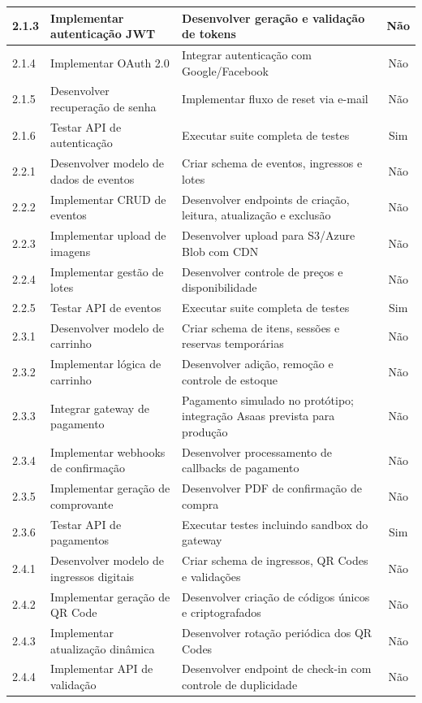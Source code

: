 \begin{table}[H]
\begin{tabular}{|p{0.9cm}|p{6.2cm}|p{5.7cm}|c|}
2.1.3 & Implementar autenticação JWT & Desenvolver geração e validação de tokens & Não \\ \hline
2.1.4 & Implementar OAuth 2.0 & Integrar autenticação com Google/Facebook & Não \\ \hline
2.1.5 & Desenvolver recuperação de senha & Implementar fluxo de reset via e-mail & Não \\ \hline
2.1.6 & Testar API de autenticação & Executar suite completa de testes & Sim \\ \hline
2.2.1 & Desenvolver modelo de dados de eventos & Criar schema de eventos, ingressos e lotes & Não \\ \hline
2.2.2 & Implementar CRUD de eventos & Desenvolver endpoints de criação, leitura, atualização e exclusão & Não \\ \hline
2.2.3 & Implementar upload de imagens & Desenvolver upload para S3/Azure Blob com CDN & Não \\ \hline
2.2.4 & Implementar gestão de lotes & Desenvolver controle de preços e disponibilidade & Não \\ \hline
2.2.5 & Testar API de eventos & Executar suite completa de testes & Sim \\ \hline
2.3.1 & Desenvolver modelo de carrinho & Criar schema de itens, sessões e reservas temporárias & Não \\ \hline
2.3.2 & Implementar lógica de carrinho & Desenvolver adição, remoção e controle de estoque & Não \\ \hline
2.3.3 & Integrar gateway de pagamento & Pagamento simulado no protótipo; integração Asaas prevista para produção & Não \\ \hline
2.3.4 & Implementar webhooks de confirmação & Desenvolver processamento de callbacks de pagamento & Não \\ \hline
2.3.5 & Implementar geração de comprovante & Desenvolver PDF de confirmação de compra & Não \\ \hline
2.3.6 & Testar API de pagamentos & Executar testes incluindo sandbox do gateway & Sim \\ \hline
2.4.1 & Desenvolver modelo de ingressos digitais & Criar schema de ingressos, QR Codes e validações & Não \\ \hline
2.4.2 & Implementar geração de QR Code & Desenvolver criação de códigos únicos e criptografados & Não \\ \hline
2.4.3 & Implementar atualização dinâmica & Desenvolver rotação periódica dos QR Codes & Não \\ \hline
2.4.4 & Implementar API de validação & Desenvolver endpoint de check-in com controle de duplicidade & Não \\ \hline

\end{tabular}
\end{table}
